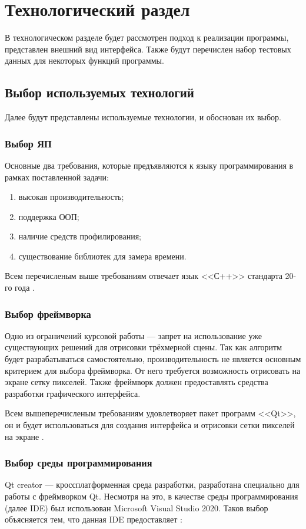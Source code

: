 \section{Технологический раздел}
В технологическом разделе будет рассмотрен подход к реализации программы, представлен внешний вид интерфейса. Также будут перечислен набор тестовых данных для некоторых функций программы.

\subsection{Выбор используемых технологий}
Далее будут представлены используемые технологии, и обоснован их выбор.

\subsubsection{Выбор ЯП}
Основные два требования, которые предъявляются к языку программирования в рамках поставленной задачи:
\begin{enumerate}
	\item высокая производительность;
	\item поддержка ООП;
	\item наличие средств профилирования;
	\item существование библиотек для замера времени.
\end{enumerate}

Всем перечисленым выше требованиям отвечает язык <<С++>> стандарта 20-го года \cite{bib:cpp_oop}.

\subsubsection{Выбор фреймворка}
Одно из ограничений курсовой работы --- запрет на использование уже существующих решений для отрисовки трёхмерной сцены. Так как алгоритм будет разрабатываться самостоятельно, производительность не является основным критерием для выбора фреймворка. От него требуется возможность отрисовать на экране сетку пикселей. Также фреймворк должен предоставлять средства разработки графического интерфейса.

Всем вышеперечисленым требованиям удовлетворяет пакет программ <<Qt>>, он и будет использоваться для создания интерфейса и отрисовки сетки пикселей на экране \cite{bib:qt_framework}.

\subsubsection{Выбор среды программирования}
Qt creator --- кроссплатформенная среда разработки, разработана специально для работы с фреймворком Qt. Несмотря на это, в качестве среды программирования (далее IDE) был использован Microsoft Visual Studio 2020. Таков выбор объясняется тем, что данная IDE предоставляет \cite{bib:visual_studio}:

